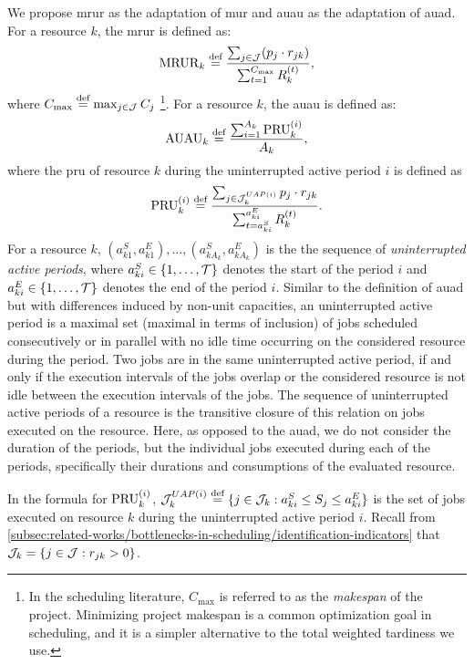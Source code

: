 We propose \acf{mrur} as the adaptation of \ac{mur} and \acf{auau} as the adaptation of \ac{auad}.
For a resource $k$, the \ac{mrur} is defined as:
$$
\indMRUR{k} \defeq \frac{\sum_{j \in \Jobs} (\duration{j} \cdot \consumption{j}{k})}%
                        {\sum_{t=1}^{C_{\max}} \capacity{k}{t}},
$$
where $C_{\max} \overset{\text{def}}{=} \max_{j \in \mathcal{J}} C_{j}$%
\footnote{In the scheduling literature,
$C_{\max}$ is referred to as the \emph{makespan} of the project.
Minimizing project makespan is a common optimization goal in scheduling,
and it is a simpler alternative to the total weighted tardiness we use.}.
For a resource $k$, the \ac{auau} is defined as:
$$
\indAUAU{k} \defeq \frac{\sum_{i=1}^{A_k} \indPRU{k}{i}}%
                        {A_k},
$$
where the \acf{pru} of resource $k$ during the uninterrupted active period $i$
is defined as
$$
\indPRU{k}{i} \defeq \frac{\sum_{j \in \JobsOnResourceInPeriod{k}{i}}
                                \duration{j} \cdot \consumption{j}{k}}%
                          {\sum_{t=a_{ki}^{S}}^{a_{ki}^{E}} \capacity{k}{t} }.
$$
For a resource $k$,
$(a_{k1}^{S}, a_{k1}^{E}), \dots, (a_{kA_k}^{S}, a_{kA_k}^{E})$
is the the sequence of \emph{uninterrupted active periods},
where $a_{ki}^{S} \in \{{1}, \dots, {\mathcal{T}}\}$ denotes the start of the period $i$
and $a_{ki}^{E} \in \{{1}, \dots, {\mathcal{T}}\}$ denotes the end of the period $i$.
Similar to the definition of \ac{auad} but with differences induced by non-unit capacities,
an uninterrupted active period is a maximal set (maximal in terms of inclusion)
of jobs scheduled consecutively or in parallel with no idle time
occurring on the considered resource during the period.
Two jobs are in the same uninterrupted active period, if and only if
the execution intervals of the jobs overlap
or the considered resource is not idle between the execution intervals of the jobs.
The sequence of uninterrupted active periods of a resource is the transitive closure of this relation
on jobs executed on the resource.
Here, as opposed to the \ac{auad},
we do not consider the duration of the periods,
but the individual jobs executed during each of the periods,
specifically their durations and consumptions of the evaluated resource.

In the formula for $\operatorname{PRU}_{k}^{(i)}$,
$\mathcal{J}_{k}^{UAP(i)} \overset{\text{def}}{=} \{ j \in \mathcal{J}_{k} : a_{ki}^{S} \leq S_{j} \leq a_{ki}^{E} \}$
is the set of jobs executed on resource $k$ during the uninterrupted active period $i$.
Recall from \cref{subsec:related-works/bottlenecks-in-scheduling/identification-indicators} that
$\mathcal{J}_{k} = \{ j \in \mathcal{J} : r_{j k} > 0 \}$.

